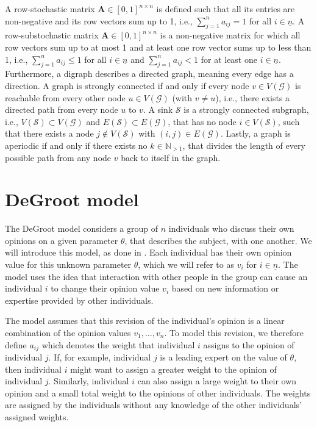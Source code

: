 \documentclass[journal,compsoc,10pt]{IEEEtran}
\newcommand{\NN}{\mathbb{N}}
\newcommand{\gG}{\mathcal{G}}
\newcommand{\gS}{\mathcal{S}} %
\renewcommand{\vec}[1]{\bm{#1}}        %
\newcommand{\mat}[1]{\bm{#1}}          %
\newtheorem{definition}{Definition}[section]
\begin{document}
A row-stochastic matrix $\mat A \in [0,1]^{n\times n}$ is defined such that all its entries are non-negative and its row vectors sum up to 1, i.e., $\sum_{j=1}^na_{ij} = 1$ for all $i \in \underline{n}$. A row-substochastic matrix $\mat A \in [0,1]^{n\times n}$ is a non-negative matrix for which all row vectors sum up to at most 1 and at least one row vector sums up to less than 1, i.e., $\sum_{j=1}^na_{ij} \leq 1$ for all $i\in \underline{n}$ and $\sum_{j=1}^na_{ij} < 1$ for at least one $i\in \underline{n}$. Furthermore, a digraph describes a directed graph, meaning every edge has a direction. A graph is strongly connected if and only if every node $v \in V(\gG)$ is reachable from every other node $u \in V(\gG)$ (with $v \neq u$), i.e., there exists a directed path from every node $u$ to $v$. A sink $\gS$ is a strongly connected subgraph, i.e., $V(\gS) \subset V(\gG)$ and $E(\gS) \subset E(\gG)$, that has no node $i\in V(\gS)$, such that there exists a node $j\notin V(\gS)$ with $(i,j)\in E(\gG)$.
Lastly, a graph is aperiodic if and only if there exists no $k \in \NN_{>1}$, that divides the length of every possible path from any node $v$ back to itself in the graph. 


\section{DeGroot model}\label{sec:degroot}
The DeGroot model considers a group of $n$ individuals who discuss their own opinions on a given parameter $\theta$, that describes the subject, with one another. We will introduce this model, as done in \cite{Degroot01031974}. Each individual has their own opinion value for this unknown parameter $\theta$, which we will refer to as $v_i$ for $i \in \underline{n}$. The model uses the idea that interaction with other people in the group can cause an individual $i$ to change their opinion value $v_i$ based on new information or expertise provided by other individuals.


The model assumes that this revision of the individual's opinion is a linear combination of the opinion values $v_1, \dots, v_n$. To model this revision, we therefore define $a_{ij}$ which denotes the weight that individual $i$ assigns to the opinion of individual $j$. If, for example, individual $j$ is a leading expert on the value of $\theta$, then individual $i$ might want to assign a greater weight to the opinion of individual $j$. Similarly, individual $i$ can also assign a large weight to their own opinion and a small total weight to the opinions of other individuals. The weights are assigned by the individuals without any knowledge of the other individuals' assigned weights.
\end{document}
